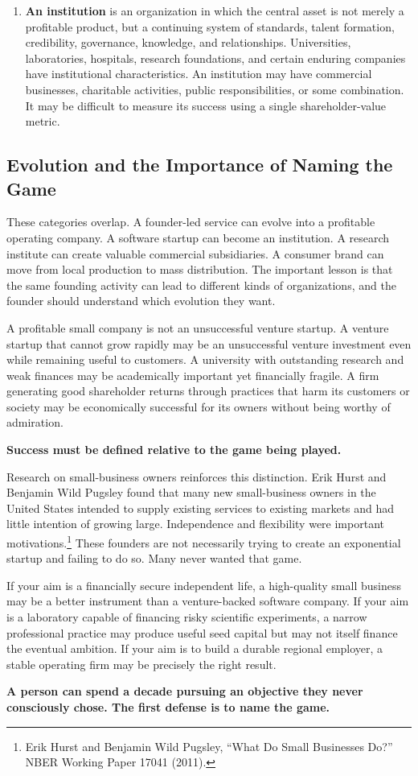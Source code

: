 \begin{enumerate}[label=\textbf{\arabic*.},leftmargin=11pt,itemsep=1.5pt,topsep=1.5pt,parsep=0pt]
  \item \textbf{An institution} is an organization in which the central asset is not merely a profitable product, but a continuing system of standards, talent formation, credibility, governance, knowledge, and relationships. Universities, laboratories, hospitals, research foundations, and certain enduring companies have institutional characteristics. An institution may have commercial businesses, charitable activities, public responsibilities, or some combination. It may be difficult to measure its success using a single shareholder-value metric.
\end{enumerate}

\subsection{Evolution and the Importance of Naming the Game}

These categories overlap. A founder-led service can evolve into a profitable operating company. A software startup can become an institution. A research institute can create valuable commercial subsidiaries. A consumer brand can move from local production to mass distribution. The important lesson is that the same founding activity can lead to different kinds of organizations, and the founder should understand which evolution they want.

A profitable small company is not an unsuccessful venture startup. A venture startup that cannot grow rapidly may be an unsuccessful venture investment even while remaining useful to customers. A university with outstanding research and weak finances may be academically important yet financially fragile. A firm generating good shareholder returns through practices that harm its customers or society may be economically successful for its owners without being worthy of admiration.

\textbf{Success must be defined relative to the game being played.}

Research on small-business owners reinforces this distinction. Erik Hurst and Benjamin Wild Pugsley found that many new small-business owners in the United States intended to supply existing services to existing markets and had little intention of growing large. Independence and flexibility were important motivations.\footnote{Erik Hurst and Benjamin Wild Pugsley, ``What Do Small Businesses Do?'' NBER Working Paper 17041 (2011).} These founders are not necessarily trying to create an exponential startup and failing to do so. Many never wanted that game.

If your aim is a financially secure independent life, a high-quality small business may be a better instrument than a venture-backed software company. If your aim is a laboratory capable of financing risky scientific experiments, a narrow professional practice may produce useful seed capital but may not itself finance the eventual ambition. If your aim is to build a durable regional employer, a stable operating firm may be precisely the right result.

\textbf{A person can spend a decade pursuing an objective they never consciously chose. The first defense is to name the game.}

